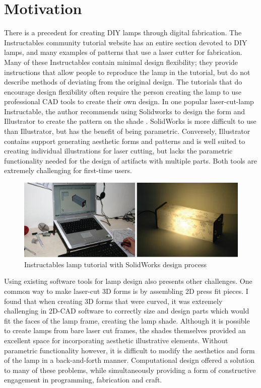\section{Motivation}
There is a precedent for creating DIY lamps through digital fabrication. The Instructables community tutorial website has an entire section devoted to DIY lamps, and many examples of patterns that use a laser cutter for fabrication.  Many of these Instructables contain minimal design flexibility; they provide instructions that allow people to reproduce the lamp in the tutorial, but do not describe methods of deviating from the original design. The tutorials that do encourage design flexibility often require the person creating the lamp to use professional CAD tools to create their own design. In one popular laser-cut-lamp Instructable, the author recommends using Solidworks to design the form and Illustrator to create the pattern on the shade \cite{instructables_lamp}. SolidWorks is more difficult to use than Illustrator, but has the benefit of being parametric. Conversely, Illustrator contains support generating aesthetic forms and patterns and is well suited to creating individual illustrations for laser cutting, but lacks the parametric functionality needed for the design of artifacts with multiple parts. Both tools are extremely challenging for first-time users.
\begin{center}
\begin{figure}[h!]
\includegraphics[width=\columnwidth]{images/solidworks_lamp.png}
\caption{Instructables lamp tutorial with SolidWorks design process}
\end{figure}
\end{center}
Using existing software tools for lamp design also presents other challenges. One common way to make laser-cut 3D forms is by assembling 2D press fit pieces. I found that when creating 3D forms that were curved, it was extremely challenging in 2D-CAD software to correctly size and design parts which would fit the faces of the lamp frame, creating the lamp shade. Although it is possible to create lamps from bare laser cut frames, the shades themselves provided an excellent space for incorporating aesthetic illustrative elements. Without parametric functionality however, it is difficult to modify the aesthetics and form of the lamp in a back-and-forth manner. Computational design offered a solution to many of these problems, while simultaneously providing a form of constructive engagement in programming, fabrication and craft.

